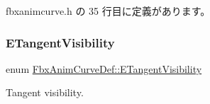  fbxanimcurve.\+h の 35 行目に定義があります。

\mbox{\label{class_fbx_anim_curve_def_a70c49072776ac6b3426c57dd80e16e3b}} 
\subsubsection{\texorpdfstring{E\+Tangent\+Visibility}{ETangentVisibility}}
{\footnotesize\ttfamily enum \hyperlink{class_fbx_anim_curve_def_a70c49072776ac6b3426c57dd80e16e3b}{Fbx\+Anim\+Curve\+Def\+::\+E\+Tangent\+Visibility}}



Tangent visibility. 

